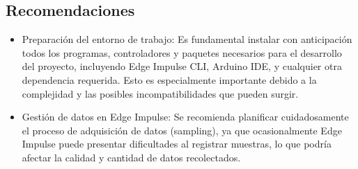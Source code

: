 \documentclass[12pt,a4paper]{article}
\begin{document}
\subsection{Recomendaciones}  
\begin{itemize}
    \item Preparación del entorno de trabajo: Es fundamental instalar con anticipación todos los programas, controladores y paquetes necesarios para el desarrollo del proyecto, incluyendo Edge Impulse CLI, Arduino IDE, y cualquier otra dependencia requerida. Esto es especialmente importante debido a la complejidad y las posibles incompatibilidades que pueden surgir.  
    \item Gestión de datos en Edge Impulse: Se recomienda planificar cuidadosamente el proceso de adquisición de datos (sampling), ya que ocasionalmente Edge Impulse puede presentar dificultades al registrar muestras, lo que podría afectar la calidad y cantidad de datos recolectados.  
\end{itemize}
\end{document}
